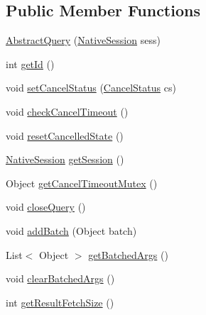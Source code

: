 \subsection*{Public Member Functions}
\begin{DoxyCompactItemize}
\item 
\mbox{\hyperlink{classcom_1_1mysql_1_1cj_1_1_abstract_query_a5f9037e29f17a601300b2e1d3d7958a8}{Abstract\+Query}} (\mbox{\hyperlink{classcom_1_1mysql_1_1cj_1_1_native_session}{Native\+Session}} sess)
\item 
int \mbox{\hyperlink{classcom_1_1mysql_1_1cj_1_1_abstract_query_a68f5ab0f91a8e8343951099d44860d36}{get\+Id}} ()
\item 
void \mbox{\hyperlink{classcom_1_1mysql_1_1cj_1_1_abstract_query_a6ec6b2efc7ef83deefe05b5148d78fca}{set\+Cancel\+Status}} (\mbox{\hyperlink{enumcom_1_1mysql_1_1cj_1_1_query_1_1_cancel_status}{Cancel\+Status}} cs)
\item 
void \mbox{\hyperlink{classcom_1_1mysql_1_1cj_1_1_abstract_query_a995c89e6b09f3bff41729b384c9b1db3}{check\+Cancel\+Timeout}} ()
\item 
void \mbox{\hyperlink{classcom_1_1mysql_1_1cj_1_1_abstract_query_a7bbc3c80a341e8e332d37de4ada4a139}{reset\+Cancelled\+State}} ()
\item 
\mbox{\hyperlink{classcom_1_1mysql_1_1cj_1_1_native_session}{Native\+Session}} \mbox{\hyperlink{classcom_1_1mysql_1_1cj_1_1_abstract_query_a1a2b19defc25729698bb071e56ad2ef0}{get\+Session}} ()
\item 
Object \mbox{\hyperlink{classcom_1_1mysql_1_1cj_1_1_abstract_query_a1159763749875aa297941f344d9cc542}{get\+Cancel\+Timeout\+Mutex}} ()
\item 
void \mbox{\hyperlink{classcom_1_1mysql_1_1cj_1_1_abstract_query_a25b6ff4c93ea4f35e116b1335c73a651}{close\+Query}} ()
\item 
void \mbox{\hyperlink{classcom_1_1mysql_1_1cj_1_1_abstract_query_ac2dda664631f654d91ec3e0f5a53a4dd}{add\+Batch}} (Object batch)
\item 
List$<$ Object $>$ \mbox{\hyperlink{classcom_1_1mysql_1_1cj_1_1_abstract_query_aef6b23f8de5efa38c0334c9245c346bf}{get\+Batched\+Args}} ()
\item 
void \mbox{\hyperlink{classcom_1_1mysql_1_1cj_1_1_abstract_query_a01ad2cac9e9df0edd3594de00c6b9a2e}{clear\+Batched\+Args}} ()
\item 
int \mbox{\hyperlink{classcom_1_1mysql_1_1cj_1_1_abstract_query_adad8ca4659c2d530cb42eac038cc0468}{get\+Result\+Fetch\+Size}} ()
\item 

\end{DoxyCompactItemize}
